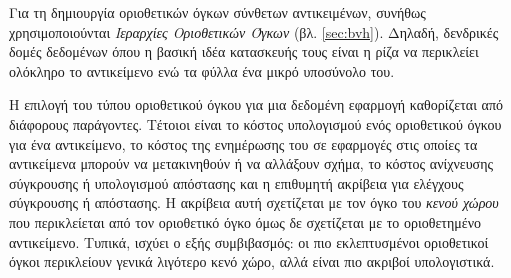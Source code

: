 Για τη δημιουργία οριοθετικών όγκων σύνθετων αντικειμένων, συνήθως 
χρησιμοποιούνται \textit{Ιεραρχίες Οριοθετικών Όγκων} (βλ. \ref{sec:bvh}).
Δηλαδή, δενδρικές δομές δεδομένων όπου η βασική ιδέα κατασκευής τους 
είναι η ρίζα να περικλείει ολόκληρο το αντικείμενο ενώ τα φύλλα 
ένα μικρό υποσύνολο του.

Η επιλογή του τύπου οριοθετικού όγκου για μια δεδομένη εφαρμογή 
καθορίζεται από διάφορους παράγοντες. Τέτοιοι είναι το κόστος υπολογισμού
ενός οριοθετικού όγκου για ένα αντικείμενο, το κόστος της ενημέρωσης
του σε εφαρμογές στις οποίες τα αντικείμενα μπορούν να μετακινηθούν 
ή να αλλάξουν σχήμα, το κόστος ανίχνευσης σύγκρουσης 
ή υπολογισμού απόστασης και η επιθυμητή 
ακρίβεια για ελέγχους σύγκρουσης ή απόστασης. Η ακρίβεια αυτή σχετίζεται 
με τον όγκο του \textit{κενού χώρου} που περικλείεται από τον οριοθετικό όγκο
όμως δε σχετίζεται με το οριοθετημένο αντικείμενο. Τυπικά, ισχύει ο εξής
συμβιβασμός: οι πιο εκλεπτυσμένοι οριοθετικοί όγκοι περικλείουν γενικά 
λιγότερο κενό χώρο, αλλά είναι πιο ακριβοί υπολογιστικά. 

